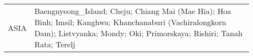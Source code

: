 \begin{table}
\begin{tabularx}{\textwidth}{lX}
  ASIA     & Baengnyeong\_Island; Cheju; Chiang Mai (Mae Hia); Hoa Binh; Imsil; Kanghwa; Khanchanaburi (Vachiralongkorn Dam); Listvyanka; Mondy; Oki; Primorskaya; Rishiri; Tanah Rata; Terelj                                                                                                                                                                                                                                                                                                                                                                                                                                                                                                                                                                                                                                                                                                                                                                                                                                                                                                                                                                                                                                                                                                                                                                                                                                                                                                                                                                                                                                                                                                                                                                                                                                                                                                                                                                                                                                                                                                                                                                                                                                                                                                                                                                                                                                                                                                                                                                                                                                                                                                                                                                                                                                                                                                                                                                                                                                                                                                                                                                                                                                                                                                                                                                                                                           
\end{tabularx}
\end{table}
